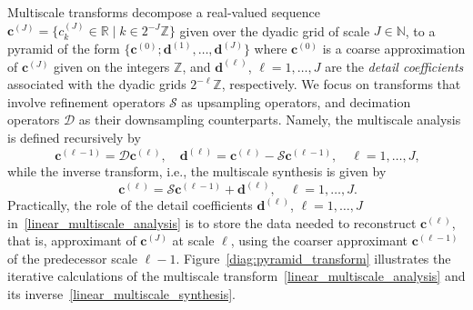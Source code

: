 \documentclass[12pt]{article}
\begin{document}
Multiscale transforms decompose a real-valued sequence $\boldsymbol{c}^{(J)} = \lbrace c^{(J)}_k\in\mathbb{R}\;\big|\; k\in 2^{-J}\mathbb{Z}\rbrace$ given over the dyadic grid of scale $J\in\mathbb{N}$, to a pyramid of the form $\lbrace \boldsymbol{c}^{(0)}; \boldsymbol{d}^{(1)}, \dots, \boldsymbol{d}^{(J)}\rbrace$ where $\boldsymbol{c}^{(0)}$ is a coarse approximation of $\boldsymbol{c}^{(J)}$ given on the integers $\mathbb{Z}$, and $\boldsymbol{d}^{(\ell)}$, $\ell=1,\dots,J$ are the \emph{detail coefficients} associated with the dyadic grids $2^{-\ell}\mathbb{Z}$, respectively. We focus on transforms that involve refinement operators $\mathcal{S}$ as upsampling operators, and decimation operators $\mathcal{D}$ as their downsampling counterparts. Namely, the multiscale analysis is defined recursively by
\begin{equation}~\label{linear_multiscale_analysis}
\boldsymbol{c}^{(\ell-1)} = \mathcal{D}\boldsymbol{c}^{(\ell)}, \quad \boldsymbol{d}^{(\ell)} = \boldsymbol{c}^{(\ell)} - \mathcal{S}\boldsymbol{c}^{(\ell-1)}, \quad \ell=1,\dots,J,
\end{equation}
while the inverse transform, i.e., the multiscale synthesis is given by
\begin{equation}~\label{linear_multiscale_synthesis}
\boldsymbol{c}^{(\ell)} = \mathcal{S}\boldsymbol{c}^{(\ell - 1)} + \boldsymbol{d}^{(\ell)}, \quad \ell=1,\dots,J.
\end{equation}
Practically, the role of the detail coefficients $\boldsymbol{d}^{(\ell)}$, $\ell=1,\dots,J$ in~\eqref{linear_multiscale_analysis} is to store the data needed to reconstruct $\boldsymbol{c}^{(\ell)}$, that is, approximant of $\boldsymbol{c}^{(J)}$ at scale $\ell$, using the coarser approximant $\boldsymbol{c}^{(\ell-1)}$ of the predecessor scale $\ell-1$. Figure~\ref{diag:pyramid_transform} illustrates the iterative calculations of the multiscale transform~\eqref{linear_multiscale_analysis} and its inverse~\eqref{linear_multiscale_synthesis}.
\end{document}
